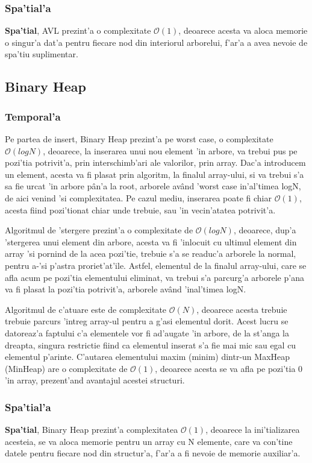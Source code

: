 \documentclass[titlepage,12pt]{article}
\numberwithin{figure}{section}
\begin{document}
\subsubsection{Spa'tial'a}
\par
\textbf{Spa'tial}, AVL prezint'a o complexitate $\mathcal{O}(1)$, deoarece acesta va aloca memorie o singur'a dat'a pentru fiecare nod din interiorul arborelui, f'ar'a a avea nevoie de spa'tiu suplimentar.

\subsection{Binary Heap}
\subsubsection{Temporal'a}
Pe partea de insert, Binary Heap prezint'a pe worst case, o complexitate $\mathcal{O}(logN)$, deoarece, la inserarea unui nou element 'in arbore, va trebui pus pe pozi'tia potrivit'a, prin interschimb'ari ale valorilor, prin array. Dac'a introducem un element, acesta va fi plasat prin algoritm, la finalul array-ului, si va trebui s'a sa fie urcat 'in arbore p\^an'a la root, arborele av\^and 'worst case in'al'timea logN, de aici venind 'si complexitatea. Pe cazul mediu, inserarea poate fi chiar $\mathcal{O}(1)$, acesta fiind pozi'tionat chiar unde trebuie, sau 'in vecin'atatea potrivit'a.
\par Algoritmul de 'stergere prezint'a o complexitate de $\mathcal{O}(logN)$, deoarece, dup'a 'stergerea unui element din arbore, acesta va fi 'inlocuit cu ultimul element din array 'si pornind de la acea pozi'tie, trebuie s'a se readuc'a arborele la normal, pentru a-'si p'astra proriet'at'ile. Astfel, elementul de la finalul array-ului, care se afla acum pe pozi'tia elementului eliminat, va trebui s'a parcurg'a arborele p'ana va fi plasat la pozi'tia potrivit'a, arborele av\^and 'inal'timea logN.
\par Algoritmul de c'atuare este de complexitate $\mathcal{O}(N)$, deoarece acesta trebuie trebuie parcurs 'intreg array-ul pentru a g'asi elementul dorit. Acest lucru se datoreaz'a faptului c'a elementele vor fi ad'augate 'in arbore, de la st'anga la dreapta, singura restrictie fiind ca elementul inserat s'a fie mai mic sau egal cu elementul p'arinte. C'autarea elementului maxim (minim) dintr-un MaxHeap (MinHeap) are o complexitate de $\mathcal{O}(1)$, deoarece acesta se va afla pe pozi'tia 0 'in array, prezent'and avantajul acestei structuri.
\subsubsection{Spa'tial'a}
\par \textbf{Spa'tial}, Binary Heap prezint'a complexitatea $\mathcal{O}(1)$, deoarece la ini'tializarea acesteia, se va aloca memorie pentru un array cu N elemente, care va con'tine datele pentru fiecare nod din structur'a, f'ar'a a fi nevoie de memorie auxiliar'a.
\end{document}

